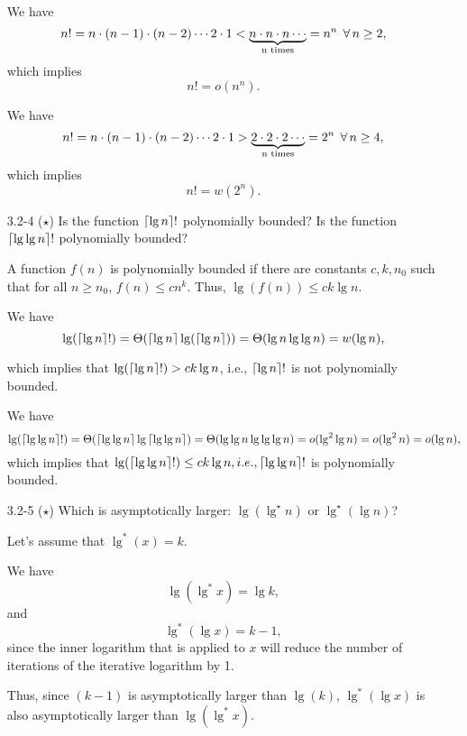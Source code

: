 \begin{enumerate}
\begin{framed}
We have
\[
  n! = n \cdot (n - 1) \cdot (n - 2) \cdots 2 \cdot 1
     < \underbrace{n \cdot n \cdot n \cdots}_\text{n times}
     = n^n\;\operatorname{\forall} n \ge 2,
\]
which implies
\[
  n! = o(n^n).
\]

We have
\[
  n! = n \cdot (n - 1) \cdot (n - 2) \cdots 2 \cdot 1
     > \underbrace{2 \cdot 2 \cdot 2 \cdots}_\text{n times}
     = 2^n\;\operatorname{\forall} n \ge 4,
\]
which implies
\[
  n! = w(2^n).
\]

\end{framed}

\newpage

\item[3.2{-}4]{($\star$) Is the function $\lceil\lg n\rceil{!}$ polynomially bounded?
Is the function $\lceil\lg \lg n\rceil{!}$ polynomially bounded?}

\begin{framed}
A function $f(n)$ is polynomially bounded if there are constants $c, k, n_0$
such that for all $n \ge n_0$, $f(n) \le c n^k$. Thus, $\lg(f(n)) \le c k \lg{n}$.

We have
\[
\lg(\lceil\lg{n}\rceil!) = \Theta(\lceil\lg{n}\rceil \lg(\lceil\lg{n}\rceil)) = \Theta(\lg{n} \lg{\lg{n}}) = w(\lg{n}),
\]

which implies that $\lg(\lceil\lg{n}\rceil!) > c k \lg{n}$, i.e., $\lceil\lg{n}\rceil{!}$
is not polynomially bounded.

We have
\[
\lg(\lceil\lg{\lg{n}}\rceil!) = \Theta(\lceil\lg{\lg{n}}\rceil\lg{\lceil\lg{\lg{n}}\rceil})
                          = \Theta(\lg{\lg{n}} \lg{\lg{\lg{n}}})
                          = o(\lg^2{\lg{n}})
                          = o(\lg^2{n})
                          = o(\lg{n}),
\]
which implies that $\lg(\lceil\lg{\lg{n}}\rceil!) \le c k \lg{n}, i.e.,
\lceil\lg{\lg{n}}\rceil{!}$ is polynomially bounded.

\end{framed}

\item[3.2{-}5]{($\star$) Which is asymptotically larger:
$\lg(\lg^\star n)$ or $\lg^\star(\lg n)$}?

\begin{framed}
Let's assume that $\lg^*(x) = k$.

We have
\[
\lg(\lg^*{x}) = \lg{k},
\]
and
\[
\lg^*(\lg{x}) = k - 1,
\]
since the inner logarithm that is applied to $x$ will reduce the number of
iterations of the iterative logarithm by 1.

Thus, since $(k - 1)$ is asymptotically larger than $\lg(k)$, $\lg^*(\lg{x})$ is
also asymptotically larger than $\lg(\lg^*{x})$.
\end{framed}


\end{enumerate}
